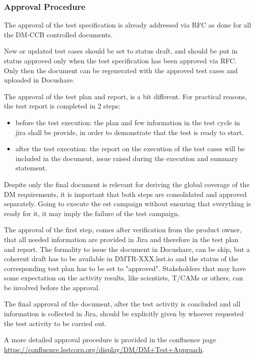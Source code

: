 \subsubsection{Approval Procedure}

The approval of the test specification is already addressed via RFC as done for all the DM-CCB controlled documents.

New or updated test cases should be set to status draft, and should be put in status approved only when the test specification has been approved via RFC.
Only then the document can be regenerated with the approved test cases and uploaded in Docushare.

The approval of the test plan and report, is a bit different.
For practical reasons, the test report is completed in 2 steps:

\begin{itemize}
\item before the test execution: the plan and few information in the test cycle in jira shall be provide, in order to demonstrate that the test is ready to start. 
\item after the test execution: the report on the execution of the test cases will be included in the document, issue raised during the execution and summary statement.
\end{itemize}

Despite only the final document is relevant for deriving the global coverage of the DM requirements, it is important that both steps are consolidated and approved separately. 
Going to execute the est campaign without ensuring that everything is ready for it, it may imply the failure of the test campaign. 

The approval of the first step, comes after verification from the product owner, that all needed information are provided in Jira and therefore in the test plan and report. The formality to issue the document in Docushare, can be skip, but a coherent draft has to be available in DMTR-XXX.lsst.io and the status of the corresponding test plan has to be set to "approved". Stakeholders that may have some expectation on the activity results, like scientists, T/CAMs or others, can be involved before the approval.

The final approval of the document, after the test activity is concluded and all information is collected in Jira, should be explicitly given by whoever requested the test activity to be carried out.


A more detailed approval procedure is provided in the confluence page \url{https://confluence.lsstcorp.org/display/DM/DM+Test+Approach}.

